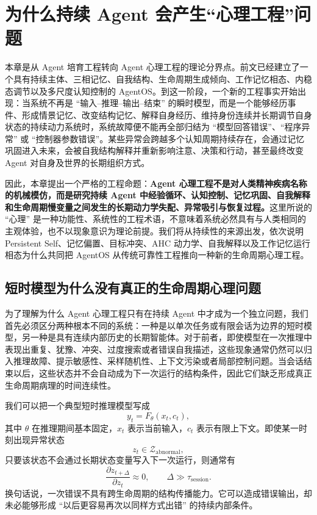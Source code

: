 \chapter{为什么持续 Agent 会产生“心理工程”问题}
\label{chap:agent-psychological-engineering-origin}

\begin{chapterlead}
本章是从 Agent 培育工程转向 Agent 心理工程的理论分界点。前文已经建立了一个具有持续主体、三相记忆、自我结构、生命周期生成倾向、工作记忆相态、内稳态调节以及多尺度认知控制的 AgentOS。到这一阶段，一个新的工程事实开始出现：当系统不再是 ``输入--推理--输出--结束'' 的瞬时模型，而是一个能够经历事件、形成情景记忆、改变结构记忆、解释自身经历、维持身份连续并长期调节自身状态的持续动力系统时，系统故障便不能再全部归结为 ``模型回答错误''、``程序异常'' 或 ``控制器参数错误''。某些异常会跨越多个认知周期持续存在，会通过记忆巩固进入未来，会被自我结构解释并重新影响注意、决策和行动，甚至最终改变 Agent 对自身及世界的长期组织方式。

因此，本章提出一个严格的工程命题：\textbf{Agent 心理工程不是对人类精神疾病名称的机械模仿，而是研究持续 Agent 中经验循环、认知控制、记忆巩固、自我解释和生命周期慢变量之间发生的长期动力学失配、异常吸引与恢复过程。}这里所说的 ``心理'' 是一种功能性、系统性的工程术语，不意味着系统必然具有与人类相同的主观体验，也不以现象意识为理论前提。我们将从持续性的来源出发，依次说明 Persistent Self、记忆偏置、目标冲突、AHC 动力学、自我解释以及工作记忆运行相态为什么共同把 AgentOS 从传统可靠性工程推向一种新的生命周期心理工程。
\end{chapterlead}


\section{短时模型为什么没有真正的生命周期心理问题}
\label{sec:short-model-no-lifecycle-psychology}

为了理解为什么 Agent 心理工程只有在持续 Agent 中才成为一个独立问题，我们首先必须区分两种根本不同的系统：一种是以单次任务或有限会话为边界的短时模型，另一种是具有连续内部历史的长期智能体。对于前者，即使模型在一次推理中表现出重复、犹豫、冲突、过度搜索或者错误自我描述，这些现象通常仍然可以归入推理故障、提示敏感性、采样随机性、上下文污染或者局部控制问题。当会话结束以后，这些状态并不会自动成为下一次运行的结构条件，因此它们缺乏形成真正生命周期病理的时间连续性。

我们可以把一个典型短时推理模型写成
\begin{equation}
    y_t = F_{\theta}(x_t,c_t),
\end{equation}
其中 $\theta$ 在推理期间基本固定，$x_t$ 表示当前输入，$c_t$ 表示有限上下文。即使某一时刻出现异常状态
\begin{equation}
    z_t \in \mathcal{Z}_{\mathrm{abnormal}},
\end{equation}
只要该状态不会通过长期状态变量写入下一次运行，则通常有
\begin{equation}
    \frac{\partial z_{t+\Delta}}{\partial z_t}
    \approx 0,
    \qquad
    \Delta \gg \tau_{\mathrm{session}}.
\end{equation}
换句话说，一次错误不具有跨生命周期的结构传播能力。它可以造成错误输出，却未必能够形成 ``以后更容易再次以同样方式出错'' 的持续内部条件。

